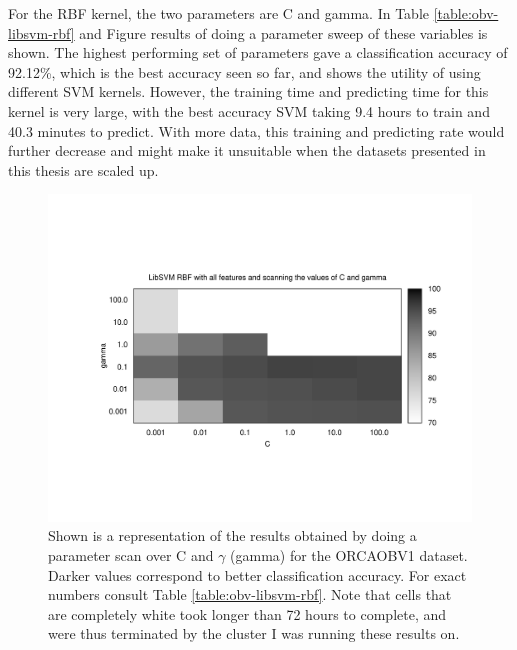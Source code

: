 \documentclass[12pt,oneside]{book}
\begin{document}
For the RBF kernel, the two parameters are C and gamma.  In Table
\ref{table:obv-libsvm-rbf} and
Figure \label{fig:gnuplot-obv-libsvm-rbf} results of doing a parameter
sweep of these variables is shown.  The highest performing set of
parameters gave a classification accuracy of 92.12\%, which is the
best accuracy seen so far, and shows the utility of using different
SVM kernels.  However, the training time and predicting time for this
kernel is very large, with the best accuracy SVM taking 9.4 hours to
train and 40.3 minutes to predict.  With more data, this training and
predicting rate would further decrease and might make it unsuitable
when the datasets presented in this thesis are scaled up.

\begin{figure}[t]
\centering
\includegraphics[width=\columnwidth]{figures/gnuplot-obv-libsvm-rbf}
\caption{Shown is a representation of the results obtained by doing a
  parameter scan over C and $\gamma$ (gamma) for the ORCAOBV1 dataset.
  Darker values correspond to better classification accuracy.  For
  exact numbers consult Table \ref{table:obv-libsvm-rbf}.
  Note that cells that are completely white took longer than 72
  hours to complete, and were thus terminated by the cluster I was
  running these results on.}
\label{fig:gnuplot-obv-libsvm-rbf}
\end{figure}
\end{document}
